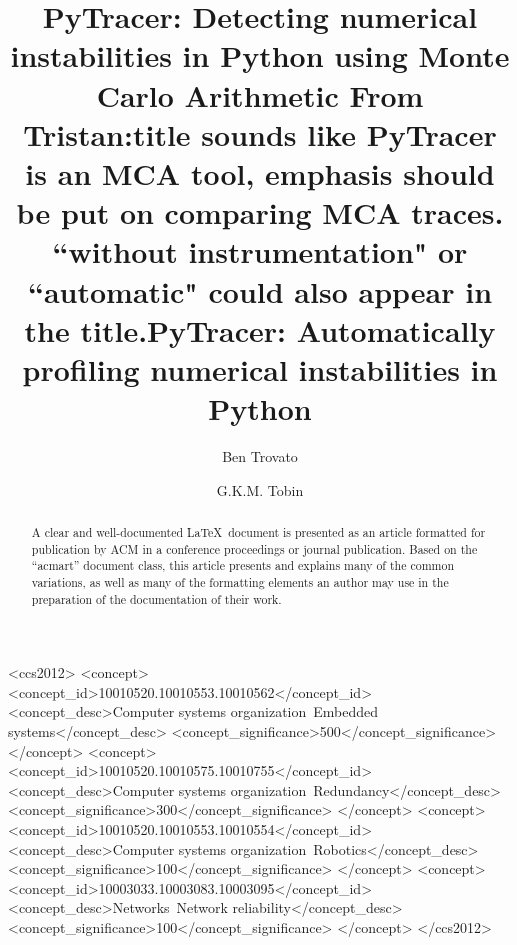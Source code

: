 \documentclass[acmconf,authordraft,anonymous,review]{acmart}
\newcommand{\tristan}[1]{\color{orange}\textbf{From Tristan:}#1\color{black}}
\begin{document}
\title{PyTracer: Detecting numerical instabilities in Python using Monte Carlo Arithmetic \tristan{title sounds like PyTracer is an MCA tool, emphasis should be put on comparing MCA traces. ``without instrumentation" or ``automatic" could also appear in the title.}}
\title{PyTracer: Automatically profiling numerical instabilities in Python}

\author{Ben Trovato}
\author{G.K.M. Tobin}
\authornotemark[1]

\renewcommand{\shortauthors}{Trovato and Tobin, et al.}

\begin{abstract}
  A clear and well-documented \LaTeX\ document is presented as an
  article formatted for publication by ACM in a conference proceedings
  or journal publication. Based on the ``acmart'' document class, this
  article presents and explains many of the common variations, as well
  as many of the formatting elements an author may use in the
  preparation of the documentation of their work.
\end{abstract}

\begin{CCSXML}
<ccs2012>
 <concept>
  <concept_id>10010520.10010553.10010562</concept_id>
  <concept_desc>Computer systems organization~Embedded systems</concept_desc>
  <concept_significance>500</concept_significance>
 </concept>
 <concept>
  <concept_id>10010520.10010575.10010755</concept_id>
  <concept_desc>Computer systems organization~Redundancy</concept_desc>
  <concept_significance>300</concept_significance>
 </concept>
 <concept>
  <concept_id>10010520.10010553.10010554</concept_id>
  <concept_desc>Computer systems organization~Robotics</concept_desc>
  <concept_significance>100</concept_significance>
 </concept>
 <concept>
  <concept_id>10003033.10003083.10003095</concept_id>
  <concept_desc>Networks~Network reliability</concept_desc>
  <concept_significance>100</concept_significance>
 </concept>
</ccs2012>
\end{CCSXML}
\end{document}
